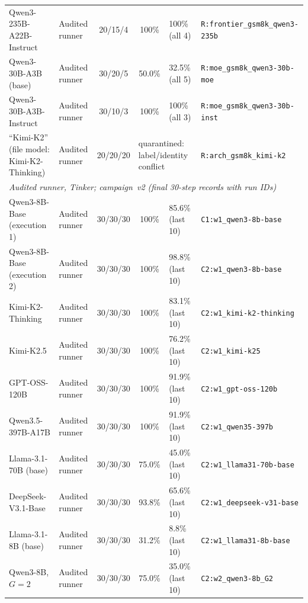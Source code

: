 \documentclass{article}
\begin{document}
\begin{table}[t]
{\begin{tabular}{@{}l l c c l l@{}}
Qwen3-235B-A22B-Instruct & Audited runner & 20/15/4 & 100\% & 100\% (all 4) & \texttt{R:frontier\_gsm8k\_qwen3-235b} \\ %
Qwen3-30B-A3B (base) & Audited runner & 30/20/5 & 50.0\% & 32.5\% (all 5) & \texttt{R:moe\_gsm8k\_qwen3-30b-moe} \\ %
Qwen3-30B-A3B-Instruct & Audited runner & 30/10/3 & 100\% & 100\% (all 3) & \texttt{R:moe\_gsm8k\_qwen3-30b-inst} \\ %
``Kimi-K2'' (file model: Kimi-K2-Thinking) & Audited runner & 20/20/20 & \multicolumn{2}{l}{quarantined: label/identity conflict} & \texttt{R:arch\_gsm8k\_kimi-k2} \\
\midrule
\multicolumn{6}{l}{\textit{Audited runner, Tinker; campaign~v2 (final 30-step records with run IDs)}} \\
Qwen3-8B-Base (execution 1) & Audited runner & 30/30/30 & 100\% & 85.6\% (last 10) & \texttt{C1:w1\_qwen3-8b-base} \\ %
Qwen3-8B-Base (execution 2) & Audited runner & 30/30/30 & 100\% & 98.8\% (last 10) & \texttt{C2:w1\_qwen3-8b-base} \\ %
Kimi-K2-Thinking & Audited runner & 30/30/30 & 100\% & 83.1\% (last 10) & \texttt{C2:w1\_kimi-k2-thinking} \\ %
Kimi-K2.5 & Audited runner & 30/30/30 & 100\% & 76.2\% (last 10) & \texttt{C2:w1\_kimi-k25} \\ %
GPT-OSS-120B & Audited runner & 30/30/30 & 100\% & 91.9\% (last 10) & \texttt{C2:w1\_gpt-oss-120b} \\ %
Qwen3.5-397B-A17B & Audited runner & 30/30/30 & 100\% & 91.9\% (last 10) & \texttt{C2:w1\_qwen35-397b} \\ %
Llama-3.1-70B (base) & Audited runner & 30/30/30 & 75.0\% & 45.0\% (last 10) & \texttt{C2:w1\_llama31-70b-base} \\ %
DeepSeek-V3.1-Base & Audited runner & 30/30/30 & 93.8\% & 65.6\% (last 10) & \texttt{C2:w1\_deepseek-v31-base} \\ %
Llama-3.1-8B (base) & Audited runner & 30/30/30 & 31.2\% & 8.8\% (last 10) & \texttt{C2:w1\_llama31-8b-base} \\ %
Qwen3-8B, $G=2$ & Audited runner & 30/30/30 & 75.0\% & 35.0\% (last 10) & \texttt{C2:w2\_qwen3-8b\_G2} \\ %

\end{tabular}}
\end{table}
\end{document}
